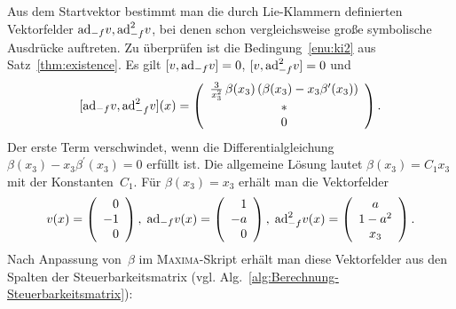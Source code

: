 \begin{example}
Aus dem Startvektor bestimmt man die durch Lie-Klammern definierten
Vektorfelder ${\operatorname{ad}}_{-f}v,{\operatorname{ad}}_{-f}^{2}v$, bei denen schon vergleichsweise
große symbolische Ausdrücke auftreten. Zu überprüfen ist die Bedingung~\ref{enu:ki2}
aus Satz~\ref{thm:existence}. Es gilt $[v,{\operatorname{ad}}_{-f}v]=0$, $[v,{\operatorname{ad}}_{-f}^{2}v]=0$
und 
\[
[{\operatorname{ad}}_{-f}v,{\operatorname{ad}}_{-f}^{2}v](x)=\left(\begin{array}{c}
\frac{3}{x_{3}^{2}}\,\beta(x_{3})\,(\beta(x_{3})-x_{3}\beta^{\prime}(x_{3}))\\
*\\
0
\end{array}\right).
\]
Der erste Term verschwindet, wenn die Differentialgleichung $\beta(x_{3})-x_{3}\beta^{\prime}(x_{3})=0$
erfüllt ist. Die allgemeine Lösung lautet $\beta(x_{3})=C_{1}x_{3}$
mit der Konstanten~$C_{1}$. Für $\beta(x_{3})=x_{3}$ erhält man
die Vektor\-felder 
\begin{equation}
v(x)=\left(\begin{array}{r}
0\\
-1\\
0
\end{array}\right),\;{\operatorname{ad}}_{-f}v(x)=\left(\begin{array}{r}
1\\
-a\\
0
\end{array}\right),\;{\operatorname{ad}}_{-f}^{2}v(x)=\left(\begin{array}{c}
a\\
1-a^{2}\\
x_{3}
\end{array}\right).\label{eq:Roessler-Lie-Klammern}
\end{equation}
Nach Anpassung von~$\beta$ im \textsc{Maxima}-Skript erhält man
diese Vektorfelder aus den Spalten der Steuerbarkeitsmatrix (vgl.
Alg.~\ref{alg:Berechnung-Steuerbarkeitsmatrix}):

\begin{maxima}\end{maxima}


\end{example}
